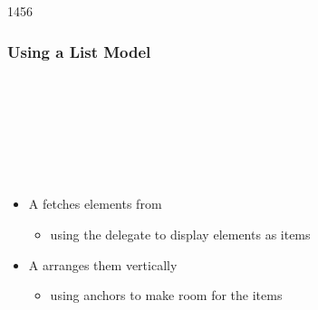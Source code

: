 \begin{slide}{1456}\frametitle{Using a List Model}

\begin{qml}
\\
\\
\\
\\
\\
\qtt{~~~~\}}\\
\qtt{\}}
\end{qml}

\begin{itemize}
\item A  fetches elements from 
  \begin{itemize}
  \item using the delegate to display elements as  items
  \end{itemize}
\item A  arranges them vertically
  \begin{itemize}
  \item using anchors to make room for the items
  \end{itemize}
\end{itemize}

\end{slide}



